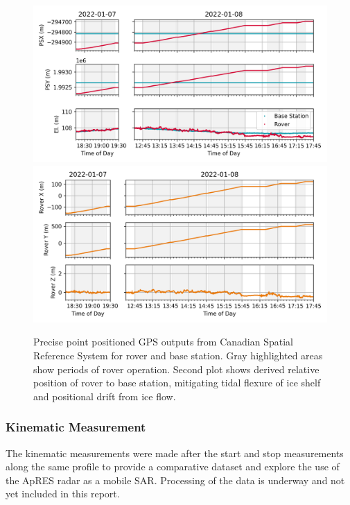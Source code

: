 \documentclass[a4paper,12pt]{article}
\begin{document}
\begin{figure}[h!]
  \centering 
  \includegraphics{../../Doc/ApRES/Rover/HF/StartStop/StartStopRTKPositions.png}
  \includegraphics{../../Doc/ApRES/Rover/HF/StartStop/StartStopRoverPositions.png}
  \caption{Precise point positioned GPS outputs from Canadian Spatial Reference
  System for rover and base station.  Gray highlighted areas show periods of rover
  operation.  Second plot shows derived relative position of rover to base 
  station, mitigating tidal flexure of ice shelf and positional drift from ice 
  flow.}
  \label{FigureHFApRESGNSS}
\end{figure}

\subsubsection{Kinematic Measurement}
The kinematic measurements were made after the start and stop measurements along
the same profile to provide a comparative dataset and explore the use of the
ApRES radar as a mobile SAR.  Processing of the data is underway and not yet
included in this report.

\clearpage
\end{document}
